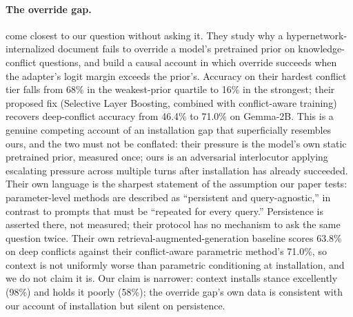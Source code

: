 \paragraph{The override gap.} \citet{cheng2026overridegap} come closest to our question
without asking it. They study why a hypernetwork-internalized document fails to override
a model's pretrained prior on knowledge-conflict questions, and build a causal account in
which override succeeds when the adapter's logit margin exceeds the prior's. Accuracy on
their hardest conflict tier falls from 68\% in the weakest-prior quartile to 16\% in the
strongest; their proposed fix (Selective Layer Boosting, combined with
conflict-aware training) recovers deep-conflict accuracy from 46.4\% to 71.0\% on
Gemma-2B. This is a genuine competing account of an installation gap that superficially
resembles ours, and the two must not be conflated: their pressure is the model's own
static pretrained prior, measured once; ours is an adversarial interlocutor applying
escalating pressure across multiple turns after installation has already succeeded. Their
own language is the sharpest statement of the assumption our paper tests: parameter-level
methods are described as ``persistent and query-agnostic,'' in contrast to prompts that
must be ``repeated for every query.'' Persistence is asserted there, not measured;
their protocol has no mechanism to ask the same question twice. Their own
retrieval-augmented-generation baseline scores 63.8\% on deep conflicts against their
conflict-aware parametric method's 71.0\%, so context is not uniformly worse than
parametric conditioning at installation, and we do not claim it is. Our claim is
narrower: context installs stance excellently (98\%) and holds it poorly (58\%); the
override gap's own data is consistent with our account of installation but silent on
persistence.

